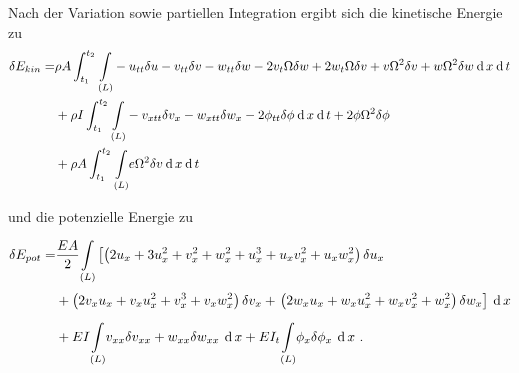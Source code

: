 	Nach der Variation sowie partiellen Integration ergibt sich die kinetische Energie zu
	\begin{equation}\label{equ:Hamilton-Variation-Partiell-Mod.}
	\begin{aligned}
	\delta E_{kin} = & \rho A \int_{t_{1}}^{t_{2}} \underset{(L)}{\int} -u_{tt}\delta u - v_{tt}\delta v - w_{tt}\delta w - 2v_{t}\Omega \delta w + 2w_{t} \Omega \delta v + v\Omega^{2}\delta v + w\Omega^{2}\delta w  \: \mathrm{d}\, x  \: \mathrm{d}\, t \\
	& + \rho I \int_{t_{1}}^{t_{2}} \underset{(L)}{\int} -v_{xtt}\delta v_{x} - w_{xtt}\delta w_{x} - 2\phi_{tt}\delta \phi \: \mathrm{d}\, x \: \mathrm{d}\, t + 2\phi \Omega^{2}\delta \phi  \\
	& + \rho A \int_{t_{1}}^{t_{2}} \underset{(L)}{\int} e\Omega^{2}\delta v \: \mathrm{d}\, x \: \mathrm{d}\, t
	\end{aligned}
	\end{equation}
	
	und die potenzielle Energie zu
	
	\begin{equation}\label{equ:Epot-mit-Variation}
	\begin{aligned}
	\delta E_{pot} = & \dfrac{EA}{2} \underset{(L)}{\int} \left[ \left( 2u_{x}+3u_{x}^{2}+v_{x}^{2}+w_{x}^{2}+u_{x}^{3}+u_{x}v_{x}^{2}+u_{x}w_{x}^{2}\right) \delta u_{x} \right. \\[1mm]
	& + \left( 2v_{x}u_{x}+v_{x}u_{x}^{2}+v_{x}^{3}+v_{x}w_{x}^{2} \right) \delta v_{x} + \left. \left( 2w_{x}u_{x}+w_{x}u_{x}^{2}+w_{x}v_{x}^{2}+w_{x}^{2} \right) \delta w_{x} \right] \: \mathrm{d}\, x  \\[2mm]
	& + EI \underset{(L)}{\int} v_{xx}\delta v_{xx} + w_{xx}\delta w_{xx} \, \: \mathrm{d}\, x + EI_{t} \underset{(L)}{\int} \phi_{x}\delta \phi_{x} \, \: \mathrm{d}\, x \ .
	\end{aligned}  
	\end{equation}
	
